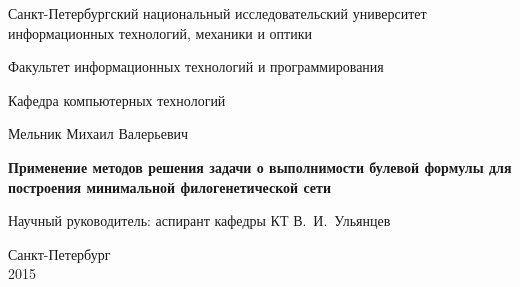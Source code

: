 \documentclass{report}
\begin{document}

\initializefrontsections

\pagestyle{title}

\begin{center}
Санкт-Петербургский национальный исследовательский университет \\ информационных технологий, механики и оптики

\vspace{2cm}

Факультет информационных технологий и программирования

Кафедра компьютерных технологий

\vspace{3cm}

{\Large Мельник Михаил Валерьевич}

\vspace{2cm}

\vbox{\LARGE\bfseries
Применение методов решения задачи о выполнимости булевой формулы для построения минимальной филогенетической сети}

\vspace{4cm}

{\Large Научный руководитель: аспирант кафедры КТ В.~И.~Ульянцев}

\vspace{6cm}

Санкт-Петербург\\ 2015
\end{center}

\newpage

\setcounter{page}{4}
\pagestyle{plain}



\tableofcontents

\startthechapters









\appendix


\end{document}
